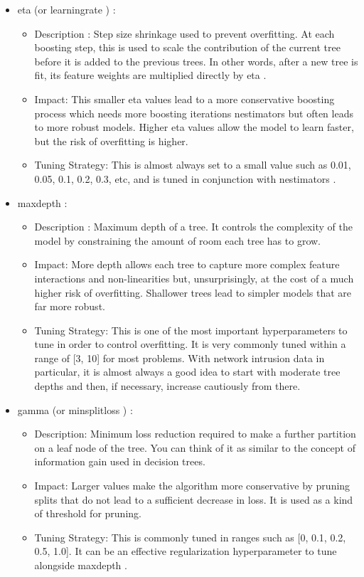 \begin{itemize}[noitemsep] 
\item eta (or learning\textunderscore rate ) : 

\begin{itemize}[noitemsep] 
\item Description : Step size shrinkage used to prevent overfitting. At each boosting step, this is used to scale the contribution of the current tree before it is added to the previous trees. In other words, after a new tree is fit, its feature weights are multiplied directly by eta .
\item Impact: This smaller eta values lead to a more conservative boosting process which needs more boosting iterations n\textunderscore estimators but often leads to more robust models. Higher eta values allow the model to learn faster, but the risk of overfitting is higher.
\item Tuning Strategy: This is almost always set to a small value such as 0.01, 0.05, 0.1, 0.2, 0.3, etc, and is tuned in conjunction with n\textunderscore estimators .
\end{itemize} 

\item max\textunderscore depth : 

\begin{itemize}[noitemsep] 
\item Description : Maximum depth of a tree. It controls the complexity of the model by constraining the amount of room each tree has to grow.
\item Impact: More depth allows each tree to capture more complex feature interactions and non-linearities but, unsurprisingly, at the cost of a much higher risk of overfitting. Shallower trees lead to simpler models that are far more robust.
\item Tuning Strategy: This is one of the most important hyperparameters to tune in order to control overfitting. It is very commonly tuned within a range of [3, 10] for most problems. With network intrusion data in particular, it is almost always a good idea to start with moderate tree depths and then, if necessary, increase cautiously from there.
\end{itemize} 

\item gamma (or min\textunderscore split\textunderscore loss ) : 

\begin{itemize}[noitemsep] 
\item Description: Minimum loss reduction required to make a further partition on a leaf node of the tree. You can think of it as similar to the concept of information gain used in decision trees.
\item Impact: Larger values make the algorithm more conservative by pruning splits that do not lead to a sufficient decrease in loss. It is used as a kind of threshold for pruning.
\item Tuning Strategy: This is commonly tuned in ranges such as [0, 0.1, 0.2, 0.5, 1.0]. It can be an effective regularization hyperparameter to tune alongside max\textunderscore depth .
\end{itemize} 


\end{itemize}
